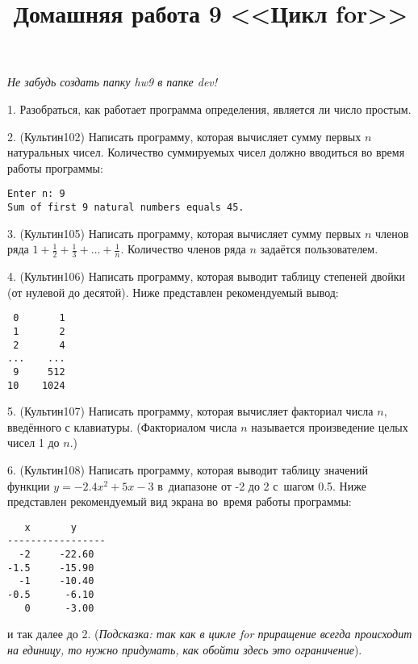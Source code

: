 \documentclass[12pt,russian,draft]{article}
\title{Домашняя работа 9 <<Цикл for>>}
\date{}
\begin{document}
\maketitle{}

\emph{Не забудь создать папку hw9 в папке dev!}

1. Разобраться, как работает программа определения, является ли число простым.

2. (Культин102) Написать программу, которая вычисляет сумму первых $n$
натуральных чисел. Количество суммируемых чисел должно вводиться во время
работы программы:
\begin{Verbatim}
Enter n: 9
Sum of first 9 natural numbers equals 45.
\end{Verbatim}

3. (Культин105) Написать программу, которая вычисляет сумму первых $n$ членов
ряда $1 + \frac{1}{2} + \frac{1}{3} + \dots + \frac{1}{n}$. Количество членов
ряда $n$ задаётся пользователем. 

4. (Культин106) Написать программу, которая выводит таблицу степеней двойки (от
нулевой до десятой). Ниже представлен рекомендуемый вывод:
\begin{Verbatim}
 0       1
 1       2
 2       4
...    ...
 9     512
10    1024
\end{Verbatim}

5. (Культин107) Написать программу, которая вычисляет факториал числа $n$,
введённого с клавиатуры. (Факториалом числа $n$ называется произведение целых
чисел 1 до $n$.)

6. (Культин108) Написать программу, которая выводит таблицу значений функции $y
= -2.4x^2 + 5x - 3$ в~диапазоне от -2 до 2 с~шагом 0.5. Ниже представлен
рекомендуемый вид экрана во~время работы программы:
\begin{Verbatim}
   x       y
-----------------
  -2     -22.60
-1.5     -15.90
  -1     -10.40
-0.5      -6.10
   0      -3.00
\end{Verbatim}
и так далее до 2. (\emph{Подсказка: так как в цикле for приращение всегда
    происходит на единицу, то нужно придумать, как обойти здесь это
    ограничение}).
\end{document}

